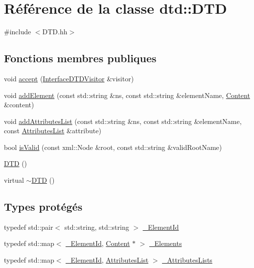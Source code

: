 \hypertarget{classdtd_1_1_d_t_d}{
\section{Référence de la classe dtd::DTD}
\label{classdtd_1_1_d_t_d}
}


{\ttfamily \#include $<$DTD.hh$>$}

\subsection*{Fonctions membres publiques}
\begin{DoxyCompactItemize}
\item 
void \hyperlink{classdtd_1_1_d_t_d_acc2b63dcafbab0567708dddadca859d4}{accept} (\hyperlink{classdtd_1_1_interface_d_t_d_visitor}{InterfaceDTDVisitor} \&visitor)
\item 
void \hyperlink{classdtd_1_1_d_t_d_a1b0ba56addc8425b8e3c996e1bdb8fc1}{addElement} (const std::string \&ns, const std::string \&elementName, \hyperlink{classdtd_1_1_content}{Content} \&content)
\item 
void \hyperlink{classdtd_1_1_d_t_d_aa36c8c04bbc0e770242e338774583c83}{addAttributesList} (const std::string \&ns, const std::string \&elementName, const \hyperlink{namespacedtd_a8d5d29abb5de0468925f321597f57f4b}{AttributesList} \&attribute)
\item 
bool \hyperlink{classdtd_1_1_d_t_d_ae05093e02a85c295d2fe1b04914ca9af}{isValid} (const xml::Node \&root, const std::string \&validRootName)
\item 
\hyperlink{classdtd_1_1_d_t_d_ab1ba4d2d6d7e9d3521c21c3581f0e090}{DTD} ()
\item 
virtual \hyperlink{classdtd_1_1_d_t_d_ad9b422dbdadb18a93d3b0c2c0c5c1399}{$\sim$DTD} ()
\end{DoxyCompactItemize}
\subsection*{Types protégés}
\begin{DoxyCompactItemize}
\item 
typedef std::pair$<$ std::string, std::string $>$ \hyperlink{classdtd_1_1_d_t_d_aebfee050799e642c65f08ff77cadfb4e}{\_\-ElementId}
\item 
typedef std::map$<$ \hyperlink{classdtd_1_1_d_t_d_aebfee050799e642c65f08ff77cadfb4e}{\_\-ElementId}, \hyperlink{classdtd_1_1_content}{Content} $\ast$ $>$ \hyperlink{classdtd_1_1_d_t_d_a3acb9bcea95d9ad98d14b7851b6151c1}{\_\-Elements}
\item 
typedef std::map$<$ \hyperlink{classdtd_1_1_d_t_d_aebfee050799e642c65f08ff77cadfb4e}{\_\-ElementId}, \hyperlink{namespacedtd_a8d5d29abb5de0468925f321597f57f4b}{AttributesList} $>$ \hyperlink{classdtd_1_1_d_t_d_ad0c96201d399a44b597764334d343752}{\_\-AttributesLists}
\end{DoxyCompactItemize}
